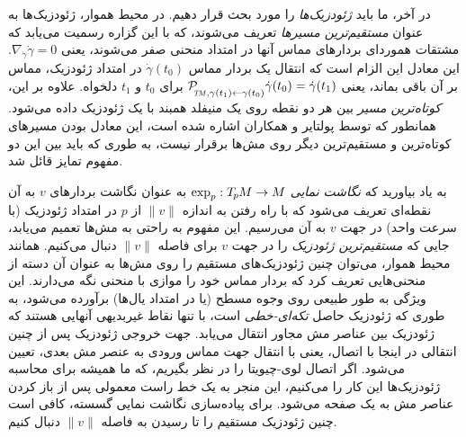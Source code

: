 در آخر، ما باید \emph{ژئودزیک‌ها} را مورد بحث قرار دهیم.
در محیط هموار، ژئودزیک‌ها به عنوان \emph{مستقیم‌ترین مسیرها} تعریف می‌شوند، که با این گزاره رسمیت می‌یابد که مشتقات هموردای بردارهای مماس آنها در امتداد منحنی صفر می‌شوند، یعنی $\nabla_{\dot{\gamma}} \dot{\gamma} = 0$.
این معادل این الزام است که انتقال یک بردار مماس $\dot{\gamma}(t_0)$ در امتداد ژئودزیک، مماس بر آن باقی بماند، یعنی
$\mathcal{P}_{\mkern-2mu\overset{}{\protect\scalebox{.6}{$\!T\!M$}, \gamma(t_1) \leftarrow \gamma(t_0)}}
 \dot{\gamma}(t_0) = \dot{\gamma}(t_1)$
برای $t_0$ و $t_1$ دلخواه.
علاوه بر این، \emph{کوتاه‌ترین مسیر} بین هر دو نقطه روی یک منیفلد همبند با یک ژئودزیک داده می‌شود.
همانطور که توسط پولتایر و همکاران\cite{polthier1998straightest} اشاره شده است، این معادل بودن مسیرهای کوتاه‌ترین و مستقیم‌ترین دیگر روی مش‌ها برقرار نیست، به طوری که باید بین این دو مفهوم تمایز قائل شد.


به یاد بیاورید که \emph{نگاشت نمایی} $\exp_p: T_{\mkern-1.5mu p}\mkern-.5muM \to M$ به عنوان نگاشت بردارهای $v$ به آن نقطه‌ای تعریف می‌شود که با راه رفتن به اندازه $\lVert v\rVert$ از $p$ در امتداد ژئودزیک (با سرعت واحد) در جهت $v$ به آن می‌رسیم.
این مفهوم به راحتی به مش‌ها تعمیم می‌یابد، جایی که \emph{مستقیم‌ترین ژئودزیک} را در جهت $v$ برای فاصله $\lVert v\rVert$ دنبال می‌کنیم.
همانند محیط هموار، می‌توان چنین ژئودزیک‌های مستقیم را روی مش‌ها به عنوان آن دسته از منحنی‌هایی تعریف کرد که بردار مماس خود را موازی با منحنی نگه می‌دارند.
این ویژگی به طور طبیعی روی وجوه مسطح (یا در امتداد یال‌ها) برآورده می‌شود، به طوری که ژئودزیک حاصل \emph{تکه‌ای-خطی} است، با تنها نقاط غیربدیهی آنهایی هستند که ژئودزیک بین عناصر مش مجاور انتقال می‌یابد.
جهت خروجی ژئودزیک پس از چنین انتقالی در اینجا با اتصال، یعنی با انتقال جهت مماس ورودی به عنصر مش بعدی، تعیین می‌شود.
اگر اتصال لوی-چیویتا را در نظر بگیریم، که ما همیشه برای محاسبه ژئودزیک‌ها این کار را می‌کنیم، این منجر به یک خط راست معمولی پس از باز کردن عناصر مش به یک صفحه می‌شود.
برای پیاده‌سازی نگاشت نمایی گسسته، کافی است چنین ژئودزیک مستقیم را تا رسیدن به فاصله $\lVert v\rVert$ دنبال کنیم.


